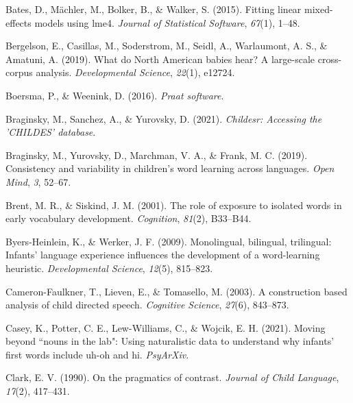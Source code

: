 \documentclass[10pt, letterpaper]{article}
\newenvironment{CSLReferences}%
  {}%
  {\par}
\begin{document}
\hypertarget{refs}{}
\begin{CSLReferences}{1}{0}
\leavevmode\hypertarget{ref-bates2015fitting}{}%
Bates, D., Mächler, M., Bolker, B., \& Walker, S. (2015). Fitting linear
mixed-effects models using {lme4}. \emph{Journal of Statistical
Software}, \emph{67}(1), 1--48.

\leavevmode\hypertarget{ref-bergelson2019north}{}%
Bergelson, E., Casillas, M., Soderstrom, M., Seidl, A., Warlaumont, A.
S., \& Amatuni, A. (2019). What do {North American} babies hear? A
large-scale cross-corpus analysis. \emph{Developmental Science},
\emph{22}(1), e12724.

\leavevmode\hypertarget{ref-boersma2016praat}{}%
Boersma, P., \& Weenink, D. (2016). \emph{Praat software}.

\leavevmode\hypertarget{ref-braginsky2021childesr}{}%
Braginsky, M., Sanchez, A., \& Yurovsky, D. (2021). \emph{Childesr:
Accessing the 'CHILDES' database}.

\leavevmode\hypertarget{ref-braginsky2019consistency}{}%
Braginsky, M., Yurovsky, D., Marchman, V. A., \& Frank, M. C. (2019).
Consistency and variability in children's word learning across
languages. \emph{Open Mind}, \emph{3}, 52--67.

\leavevmode\hypertarget{ref-brent2001role}{}%
Brent, M. R., \& Siskind, J. M. (2001). The role of exposure to isolated
words in early vocabulary development. \emph{Cognition}, \emph{81}(2),
B33--B44.

\leavevmode\hypertarget{ref-byers2009monolingual}{}%
Byers-Heinlein, K., \& Werker, J. F. (2009). Monolingual, bilingual,
trilingual: Infants' language experience influences the development of a
word-learning heuristic. \emph{Developmental Science}, \emph{12}(5),
815--823.

\leavevmode\hypertarget{ref-cameron2003construction}{}%
Cameron-Faulkner, T., Lieven, E., \& Tomasello, M. (2003). A
construction based analysis of child directed speech. \emph{Cognitive
Science}, \emph{27}(6), 843--873.

\leavevmode\hypertarget{ref-caseyURmoving}{}%
Casey, K., Potter, C. E., Lew-Williams, C., \& Wojcik, E. H. (2021).
Moving beyond ``nouns in the lab": Using naturalistic data to understand
why infants' first words include uh-oh and hi. \emph{PsyArXiv}.

\leavevmode\hypertarget{ref-clark1990pragmatics}{}%
Clark, E. V. (1990). On the pragmatics of contrast. \emph{Journal of
Child Language}, \emph{17}(2), 417--431.


\end{CSLReferences}
\end{document}
